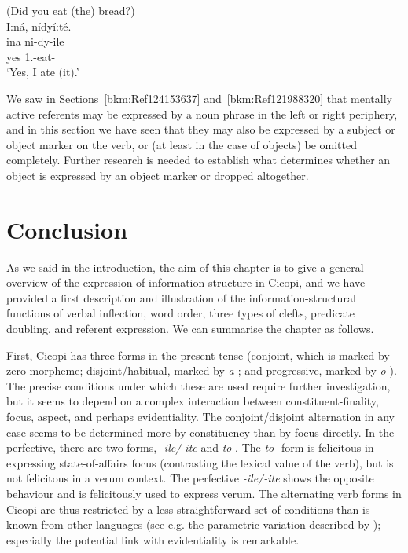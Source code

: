 \documentclass[output=paper]{langscibook}
\begin{document}
\ea
\label{bkm:Ref124153591}
(Did you eat (the) bread?)\\
I:ná, nídyí:té.\\
\gll
ina  ni-dy-ile\\
yes  1\SG.\SM{}-eat-\PFV{}\\
\glt
‘Yes, I ate (it).’\\

\z

We saw in Sections~\ref{bkm:Ref124153637} and~\ref{bkm:Ref121988320} that mentally active referents may be expressed by a noun phrase in the left or right periphery, and in this section we have seen that they may also be expressed by a subject or object marker on the verb, or (at least in the case of objects) be omitted completely. Further research is needed to establish what determines whether an object is expressed by an object marker or dropped altogether.

\section{Conclusion}

As we said in the introduction, the aim of this chapter is to give a general overview of the expression of information structure in Cicopi, and we have provided a first description and illustration of the information-structural functions of verbal inflection, word order, three types of clefts, predicate doubling, and referent expression. We can summarise the chapter as follows.

First, Cicopi has three forms in the present tense (conjoint, which is marked by zero morpheme; disjoint/habitual, marked by \textit{a-}; and progressive, marked by \textit{o-}). The precise conditions under which these are used require further investigation, but it seems to depend on a complex interaction between constituent-finality, focus, aspect, and perhaps evidentiality. The conjoint/disjoint alternation in any case seems to be determined more by constituency than by focus directly. In the perfective, there are two forms, \textit{{}-ile/-ite} and \textit{to}{}-. The \textit{to-} form is felicitous in expressing state-of-affairs focus (contrasting the lexical value of the verb), but is not felicitous in a verum context. The perfective \textit{{}-ile/-ite} shows the opposite behaviour and is felicitously used to express verum. The alternating verb forms in Cicopi are thus restricted by a less straightforward set of conditions than is known from other languages (see e.g. the parametric variation described by \citealt{vanderWal2017}); especially the potential link with evidentiality is remarkable.
\end{document}
